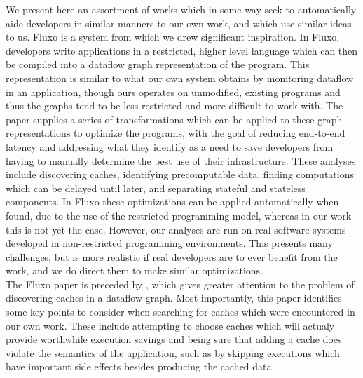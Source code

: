 \documentclass[msc,oneside]{ubcthesis}
\begin{document}
	We present here an assortment of works which in some way seek to automatically aide developers in similar manners to our own work, and which use similar ideas to us. Fluxo \cite{Kiciman2010} is a system from which we drew significant inspiration. In Fluxo, developers write applications in a restricted, higher level language which can then be compiled into a dataflow graph representation of the program. This representation is similar to what our own system obtains by monitoring dataflow in an application, though ours operates on unmodified, existing programs and thus the graphs tend to be less restricted and more difficult to work with. The paper supplies a series of transformations which can be applied to these graph representations to optimize the programs, with the goal of reducing end-to-end latency and addressing what they identify as a need to save developers from having to manually determine the best use of their infrastructure. These analyses include discovering caches, identifying precomputable data, finding computations which can be delayed until later, and separating stateful and stateless components. In Fluxo these optimizations can be applied automatically when found, due to the use of the restricted programming model, whereas in our work this is not yet the case. However, our analyses are run on real software systems developed in non-restricted programming environments. This presents many challenges, but is more realistic if real developers are to ever benefit from the work, and we do direct them to make similar optimizations.\\
	
	The Fluxo paper is preceded by \cite{Rasmussen2009}, which gives greater attention to the problem of discovering caches in a dataflow graph. Most importantly, this paper identifies some key points to consider when searching for caches which were encountered in our own work. These include attempting to choose caches which will actualy provide worthwhile execution savings and being sure that adding a cache does violate the semantics of the application, such as by skipping executions which have important side effects besides producing the cached data.\\
	
\end{document}
